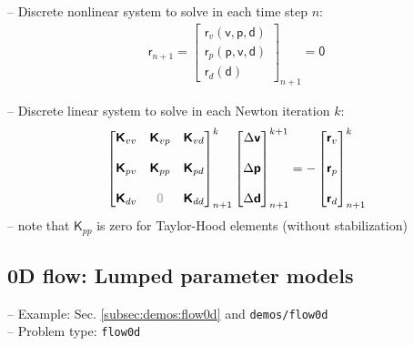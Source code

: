 \documentclass[a4paper,12pt]{report}
\newcommand{\bs}[1]{\boldsymbol{#1}}
\newcommand{\zerom}{\textcolor{lightgray}{\bs{\mathsf{0}}}}
\newcommand{\ROP}{\bs{\mathsf{r}}}
\begin{document}
-- Discrete nonlinear system to solve in each time step $n$:
\begin{align}
\ROP_{n+1} = \begin{bmatrix} \ROP_{v}(\bs{\mathsf{v}},\bs{\mathsf{p}},\bs{\mathsf{d}}) \\ \ROP_{p}(\bs{\mathsf{p}},\bs{\mathsf{v}},\bs{\mathsf{d}}) \\ \ROP_{d}(\bs{\mathsf{d}}) \end{bmatrix}_{n+1} = \bs{\mathsf{0}}\label{eq:nonlin_sys_fluid_ale}
\end{align}

-- Discrete linear system to solve in each Newton iteration $k$:
\begin{align}
\begin{bmatrix} \bs{\mathsf{K}}_{vv} & \bs{\mathsf{K}}_{vp} & \bs{\mathsf{K}}_{vd} \\ \\ \bs{\mathsf{K}}_{pv} & \bs{\mathsf{K}}_{pp} & \bs{\mathsf{K}}_{pd} \\ \\ \bs{\mathsf{K}}_{dv}  & \zerom & \bs{\mathsf{K}}_{dd} \end{bmatrix}_{n+1}^{k}\begin{bmatrix} \Delta\bs{\mathsf{v}} \\ \\ \Delta\bs{\mathsf{p}} \\ \\ \Delta\bs{\mathsf{d}} \end{bmatrix}_{n+1}^{k+1}=-\begin{bmatrix} \ROP_{v} \\ \\ \ROP_{p} \\ \\ \ROP_{d} \end{bmatrix}_{n+1}^{k} \label{eq:lin_sys_fluid_ale}
\end{align}
-- note that $\bs{\mathsf{K}}_{pp}$ is zero for Taylor-Hood elements (without stabilization)


\subsection{0D flow: Lumped parameter models}\label{subsec:flow0d}

-- Example: Sec. \ref{subsec:demos:flow0d} and \verb"demos/flow0d"\\

-- Problem type: \verb"flow0d"\\
\end{document}
